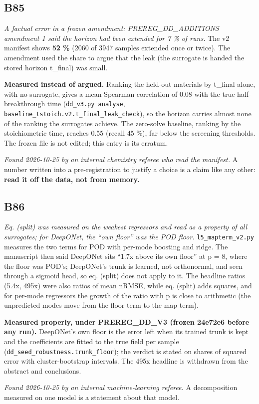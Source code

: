 \documentclass[10pt]{article}
\begin{document}
\subsection*{B85}\label{led:B85}
\begin{description}[leftmargin=0pt,itemsep=1pt]
\item[Defect.] \emph{A factual error in a frozen amendment: PREREG\_DD\_ADDITIONS amendment 1 said the horizon had been extended for 7 \% of runs.} The v2 manifest shows \textbf{52 \%} (2060 of 3947 samples extended once or twice). The amendment used the share to argue that the leak (the surrogate is handed the stored horizon t\_final) was small.
\item[Resolution.] \textbf{Measured instead of argued.} Ranking the held-out materials by t\_final alone, with no surrogate, gives a mean Spearman correlation of 0.08 with the true half-breakthrough time (\texttt{dd\_v3.py analyse}, \texttt{baseline\_tstoich.v2.t\_final\_leak\_check}), so the horizon carries almost none of the ranking the surrogates achieve. The zero-solve baseline, ranking by the stoichiometric time, reaches 0.55 (recall 45 \%), far below the screening thresholds. The frozen file is not edited; this entry is its erratum.
\item[Note.] \emph{Found 2026-10-25 by an internal chemistry referee who read the manifest.} A number written into a pre-registration to justify a choice is a claim like any other: \textbf{read it off the data, not from memory.}
\end{description}
\subsection*{B86}\label{led:B86}
\begin{description}[leftmargin=0pt,itemsep=1pt]
\item[Defect.] \emph{Eq. (split) was measured on the weakest regressors and read as a property of all surrogates; for DeepONet, the ``own floor'' was the POD floor.} \texttt{l5\_mapterm\_v2.py} measures the two terms for POD with per-mode boosting and ridge. The manuscript then said DeepONet sits ``1.7x above its own floor'' at p = 8, where the floor was POD's; DeepONet's trunk is learned, not orthonormal, and seen through a sigmoid head, so eq. (split) does not apply to it. The headline ratios (5.4x, 495x) were also ratios of mean nRMSE, while eq. (split) adds squares, and for per-mode regressors the growth of the ratio with p is close to arithmetic (the unpredicted modes move from the floor term to the map term).
\item[Resolution.] \textbf{Measured properly, under PREREG\_DD\_V3 (frozen 24e72e6 before any run).} DeepONet's own floor is the error left when its trained trunk is kept and the coefficients are fitted to the true field per sample (\texttt{dd\_seed\_robustness.trunk\_floor}); the verdict is stated on shares of squared error with cluster-bootstrap intervals. The 495x headline is withdrawn from the abstract and conclusions.
\item[Note.] \emph{Found 2026-10-25 by an internal machine-learning referee.} A decomposition measured on one model is a statement about that model.
\end{description}
\end{document}
